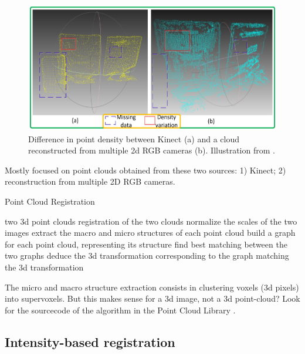 \documentclass[11pt]{article} %
\begin{document}
\begin{figure}
  \centering
  \includegraphics[width= \linewidth]{kinect.png}
  \caption{Difference in point density between Kinect (a) and a cloud reconstructed from multiple 2d RGB cameras (b). Illustration from \cite{huang:kinect}.}
  \label{fig:kinect}
\end{figure}

Mostly focused on point clouds obtained from these two sources: 1) Kinect; 2) reconstruction from multiple 2D RGB cameras. 
\begin{algorithm}
\caption{Point Cloud Registration \cite{huang:kinect}}
\label{algo:kinect}
\begin{algorithmic}
  \REQUIRE two 3d point clouds
  \ENSURE registration of the two clouds
  \STATE normalize the scales of the two images
  \STATE extract the macro and micro structures of each point cloud
  \STATE build a graph for each point cloud, representing its structure
  \STATE find best matching between the two graphs
  \STATE deduce the 3d transformation corresponding to the graph matching
  \RETURN the 3d transformation
\end{algorithmic}
\end{algorithm}

The micro and macro structure extraction consists in clustering voxels (3d pixels) into supervoxels. But this makes sense for a 3d image, not a 3d point-cloud? Look for the sourcecode of the algorithm in the Point Cloud Library \cite{rusu:pclib}.
  
  \subsection{Intensity-based registration}
\end{document}
